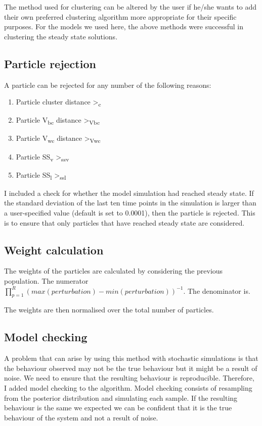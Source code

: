 {The method used for clustering can be altered by the user if he/she wants to add their own preferred clustering algorithm more appropriate for their specific purposes. For the models we used here, the above methods were successful in clustering the steady state solutions. 

\subsection{Particle rejection}

A particle can be rejected for any number of the following reasons:
\begin{enumerate}
	\item Particle cluster distance \textgreater \textepsilon\textsubscript{c}
	\item Particle V\textsubscript{bc} distance \textgreater \textepsilon \textsubscript{Vbc}
	\item Particle V\textsubscript{wc} distance \textgreater \textepsilon \textsubscript{Vwc}
	\item Particle SS\textsubscript{v} \textgreater \textepsilon \textsubscript{ssv}
	\item Particle SS\textsubscript{l}  \textgreater \textepsilon \textsubscript{ssl}
\end{enumerate}


I included a check for whether the model simulation had reached steady state. If the standard deviation of the last ten time points in the simulation is larger than a user-specified value (default is set to 0.0001), then the particle is rejected. This is to ensure that only particles that have reached steady state are considered. 

\subsection{Weight calculation}

The weights of the particles are calculated by considering the previous population. The numerator $\prod_{p=1}^{R} (max(perturbation) - min(perturbation))^{-1}$. The denominator is.

The weights are then normalised over the total number of particles. 
    

\subsection{Model checking}

A problem that can arise by using this method with stochastic simulations is that the behaviour observed may not be the true behaviour but it might be a result of noise. We need to ensure that the resulting behaviour is reproducible. Therefore, I added model checking to the algorithm. Model checking consists of resampling from the posterior distribution and simulating each sample. If the resulting behaviour is the same we expected we can be confident that it is the true behaviour of the system and not a result of noise. 


}
